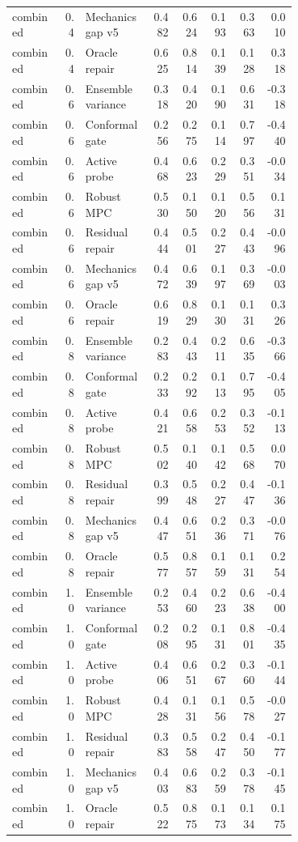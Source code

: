 \documentclass{article}
\begin{document}
\begin{center}
\begin{longtable}{p{0.18\linewidth}rp{0.23\linewidth}rrrrr}
combined & 0.4 & Mechanics gap v5 & 0.482 & 0.624 & 0.193 & 0.363 & 0.010\\
combined & 0.4 & Oracle repair & 0.625 & 0.814 & 0.139 & 0.128 & 0.318\\
combined & 0.6 & Ensemble variance & 0.318 & 0.420 & 0.190 & 0.631 & -0.318\\
combined & 0.6 & Conformal gate & 0.256 & 0.275 & 0.114 & 0.797 & -0.440\\
combined & 0.6 & Active probe & 0.468 & 0.623 & 0.229 & 0.351 & -0.034\\
combined & 0.6 & Robust MPC & 0.530 & 0.150 & 0.120 & 0.556 & 0.131\\
combined & 0.6 & Residual repair & 0.444 & 0.501 & 0.227 & 0.443 & -0.096\\
combined & 0.6 & Mechanics gap v5 & 0.472 & 0.639 & 0.197 & 0.369 & -0.003\\
combined & 0.6 & Oracle repair & 0.619 & 0.829 & 0.130 & 0.131 & 0.326\\
combined & 0.8 & Ensemble variance & 0.283 & 0.443 & 0.211 & 0.635 & -0.366\\
combined & 0.8 & Conformal gate & 0.233 & 0.292 & 0.113 & 0.795 & -0.405\\
combined & 0.8 & Active probe & 0.421 & 0.658 & 0.253 & 0.352 & -0.113\\
combined & 0.8 & Robust MPC & 0.502 & 0.140 & 0.142 & 0.568 & 0.070\\
combined & 0.8 & Residual repair & 0.399 & 0.548 & 0.227 & 0.447 & -0.136\\
combined & 0.8 & Mechanics gap v5 & 0.447 & 0.651 & 0.236 & 0.371 & -0.076\\
combined & 0.8 & Oracle repair & 0.577 & 0.857 & 0.159 & 0.131 & 0.254\\
combined & 1.0 & Ensemble variance & 0.253 & 0.460 & 0.223 & 0.638 & -0.400\\
combined & 1.0 & Conformal gate & 0.208 & 0.295 & 0.131 & 0.801 & -0.435\\
combined & 1.0 & Active probe & 0.406 & 0.651 & 0.267 & 0.360 & -0.144\\
combined & 1.0 & Robust MPC & 0.428 & 0.131 & 0.156 & 0.578 & -0.027\\
combined & 1.0 & Residual repair & 0.383 & 0.558 & 0.247 & 0.450 & -0.177\\
combined & 1.0 & Mechanics gap v5 & 0.403 & 0.683 & 0.259 & 0.378 & -0.145\\
combined & 1.0 & Oracle repair & 0.522 & 0.875 & 0.173 & 0.134 & 0.175\\
\bottomrule
\end{longtable}
\normalsize
\end{center}
\end{document}
